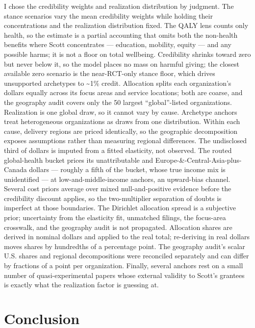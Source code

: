\documentclass[
  11pt,
  letterpaper,
  DIV=11,
  numbers=noendperiod]{scrartcl}
\begin{document}
I chose the credibility weights and realization distribution by
judgment. The stance scenarios vary the mean credibility weights while
holding their concentrations and the realization distribution fixed. The
QALY lens counts only health, so the estimate is a partial accounting
that omits both the non-health benefits where Scott concentrates ---
education, mobility, equity --- and any possible harms; it is not a
floor on total wellbeing. Credibility shrinks toward zero but never
below it, so the model places no mass on harmful giving; the closest
available zero scenario is the near-RCT-only stance floor, which drives
unsupported archetypes to \textasciitilde1\% credit. Allocation splits
each organization's dollars equally across its focus areas and service
locations; both are coarse, and the geography audit covers only the 50
largest ``global''-listed organizations. Realization is one global draw,
so it cannot vary by cause. Archetype anchors treat heterogeneous
organizations as draws from one distribution. Within each cause,
delivery regions are priced identically, so the geographic decomposition
exposes assumptions rather than measuring regional differences. The
undisclosed third of dollars is imputed from a fitted elasticity, not
observed. The routed global-health bucket prices its unattributable and
Europe-\&-Central-Asia-plus-Canada dollars --- roughly a fifth of the
bucket, whose true income mix is unidentified --- at
low-and-middle-income anchors, an upward-bias channel. Several cost
priors average over mixed null-and-positive evidence before the
credibility discount applies, so the two-multiplier separation of doubts
is imperfect at those boundaries. The Dirichlet allocation spread is a
subjective prior; uncertainty from the elasticity fit, unmatched
filings, the focus-area crosswalk, and the geography audit is not
propagated. Allocation shares are derived in nominal dollars and applied
to the real total; re-deriving in real dollars moves shares by
hundredths of a percentage point. The geography audit's scalar U.S.
shares and regional decompositions were reconciled separately and can
differ by fractions of a point per organization. Finally, several
anchors rest on a small number of quasi-experimental papers whose
external validity to Scott's grantees is exactly what the realization
factor is guessing at.

\section{Conclusion}\label{conclusion}
\end{document}
